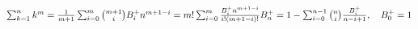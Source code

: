 $\sum_{k = 1}^ {n} k^ m = \frac{1} {m + 1}\sum_{i = 0}^ {m} \binom{m + 1} {i} B_i ^ +n^{m + 1 - i}
= m! \sum_{i = 0}^ {m} \frac{B_i ^ +n^{m + 1 - i}} {i! (m + 1 - i)!}
\newline B_n ^ += 1 - \sum_{i = 0}^ {n - 1}\binom{n} {i}\frac{B_i ^ +} {n - i + 1} ,\quad B_0 ^ += 1$ 
